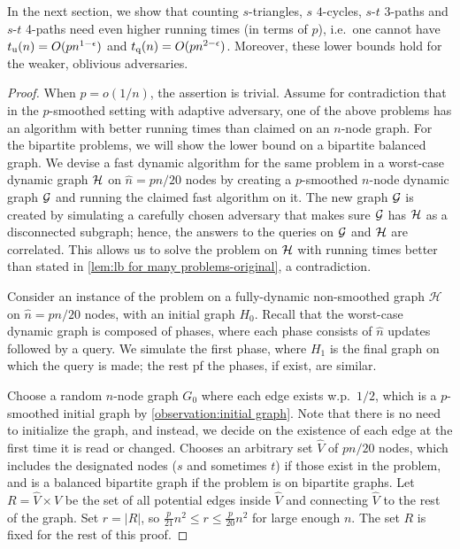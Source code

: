 \documentclass[letter,11pt]{article}
\newcommand{\st}{$s$-$t$\xspace}
\newcommand{\tu}{t_{\textnormal{u}}}
\newcommand{\tq}{t_{\textnormal{q}}}
\begin{document}
In the next section, we show that 
counting $s$-triangles, $s$ $4$-cycles, \st 3-paths and \st 4-paths need even higher running times (in terms of $p$), i.e.~one cannot have 
$\tu(n)=O(pn^{1-\epsilon})$
and 
$\tq(n)=O(pn^{2-\epsilon})$.
Moreover, these lower bounds hold for the weaker, oblivious adversaries.


\begin{proof}
	When $p = o(1/n)$, the assertion is trivial. 
    Assume for contradiction that in the $p$-smoothed setting with adaptive adversary, one of the above problems has an algorithm with better running times than claimed on an $n$-node graph.
	For the bipartite problems, we will show the lower bound on a bipartite balanced graph.
	We devise a fast dynamic algorithm for the same problem in a worst-case dynamic graph $\cal H$ on $\hat n=pn/20$ nodes 
	by creating a $p$-smoothed $n$-node dynamic graph $\cal G$ and running the claimed fast algorithm on it.
	The new graph $\cal G$ is created by simulating a carefully chosen adversary that makes sure $\cal G$ has $\cal H$ as a disconnected subgraph;
	hence, the answers to the queries on $\cal G$ and $\cal H$ are correlated.
	This allows us to solve the problem on $\cal H$ with running times better than stated in \cref{lem:lb for many problems-original},
	a contradiction.
	
	Consider an instance of the problem on a fully-dynamic non-smoothed graph $\mathcal{H}$ on $\hat n =pn/20$ nodes, with an initial graph $H_0$.
    Recall that the worst-case dynamic graph is composed of phases, 
    where each phase consists of $\hat n$ updates followed by a query.
    We simulate the first phase, where $H_1$ is the final graph on which 
    the query is made;
    the rest pf the phases, if exist, are similar.
	
    Choose a random $n$-node graph $G_0$ where each edge exists w.p.~$1/2$, 
    which is a $p$-smoothed initial graph by \cref{observation:initial graph}. 
   	Note that there is no need to initialize the graph, and instead, we decide on the existence of each edge at the first time it is read or changed.
	Chooses an arbitrary set $\hat V$ of $pn/20$ nodes, 
	which includes the designated nodes ($s$ and sometimes $t$) if those exist in the problem,
	and is a balanced bipartite graph if the problem is on bipartite graphs.
    Let $R=\hat V\times V$ be the set of all potential edges inside $\hat V$ and connecting $\hat V$ to the rest of the graph. 
    Set $r=|R|$, so $\frac{p}{21}n^2\leq r\leq\frac{p}{20}n^2$ for large enough $n$.
    The set $R$ is fixed for the rest of this proof.
    

\end{proof}
\end{document}
